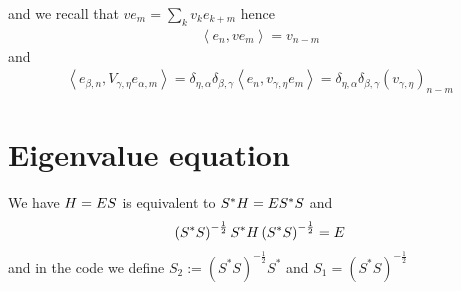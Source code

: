\documentclass[11pt,a4paper,reqno,french,tikz]{amsart}
\newcommand{\pa}[1]{\left( #1 \right)} %
\newcommand{\ps}[1]{\left< #1 \right>} %
\let\p\relax\newcommand{\p}{\psi} %
\newcommand{\f}[2]{\frac{#1}{#2}} %
\begin{document}
and we recall that $v e_m = \sum_k v_k e_{k+m}$ hence
\begin{align*}
\ps{e_n,ve_m} = v_{n-m}
\end{align*}
and
\begin{align*}
\ps{e_{\beta,n}, V_{\gamma,\eta} e_{\alpha,m}} = \delta_{\eta,\alpha} \delta_{\beta,\gamma} \ps{e_n, v_{\gamma,\eta} e_m} =  \delta_{\eta,\alpha} \delta_{\beta,\gamma} \pa{v_{\gamma,\eta}}_{n-m}
\end{align*}

\section{Eigenvalue equation}%
\label{sec:eigenvalue_equation}

We have $H \p = E S \p$ is equivalent to $S^*H \p = E S^*S \p$ and
\begin{align*}
\pa{S^* S}^{-\f 12} S^* H \pa{S^* S}^{-\f 12} \p = E \p
\end{align*}
and in the code we define $S_2 := \pa{S^* S}^{-\f 12} S^*$ and $S_1 = \pa{S^* S}^{-\f 12}$





\end{document}
